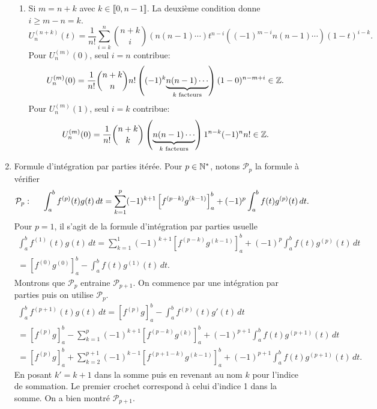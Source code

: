 \begin{enumerate}
\begin{enumerate}
    \item Si $m = n + k$ avec $k \in \llbracket 0, n-1 \rrbracket$. La deuxième condition donne $i \geq m-n = k$.
\[
 U_n^{(n+k)}(t) = \frac{1}{n!}\sum_{i=k}^{n}\binom{n+k}{i}\left( n(n-1)\cdots\right) t^{n-i}\left((-1)^{m-i}n(n-1)\cdots \right) (1-t)^{i - k}.
\]
Pour $U_n^{(m)}(0)$, seul $i=n$ contribue:
\[
 U_n^{(m)}(0) = \frac{1}{n!}\binom{n+k}{n} n! \left((-1)^{k}\underset{k \text{ facteurs}}{\underbrace{n(n-1)\cdots }}\right) (1-0)^{n-m+i}\in \mathbb{Z}.
\]
Pour $U_n^{(m)}(1)$, seul $i=k$ contribue:
\[
 U_n^{(m)}(0) = \frac{1}{n!}\binom{n+k}{k} \left(\underset{k \text{ facteurs}}{\underbrace{n(n-1)\cdots }}\right)1^{n-k} (-1)^n n! \in \mathbb{Z}.
\]
    
  \end{enumerate}

 \item Formule d'intégration par parties itérée.\newline
 Pour $p \in \mathbb{N}^*$, notons $\mathcal{P}_p$ la formule à vérifier
\[
\mathcal{P}_p : \hspace{0.5cm}
\int_a^b f^{(p)}(t) g(t)\,dt 
 = \sum_{k=1}^{p}(-1)^{k+1} \left[ f^{(p-k)} g^{(k-1)}\right]_{a}^{b}
 + (-1)^p\int_a^bf(t) g^{(p)}(t)\,dt .
\]
Pour $p=1$, il s'agit de la formule d'intégration par parties usuelle
\begin{multline*}
 \int_a^b f^{(1)}(t) g(t)\,dt 
 = \sum_{k=1}^{1}(-1)^{k+1} \left[ f^{(p-k)} g^{(k-1)}\right]_{a}^{b}
 + (-1)^p\int_a^bf(t) g^{(p)}(t)\,dt \\
 = \left[ f^{(0)} g^{(0)}\right]_{a}^{b} - \int_a^b f(t) g^{(1)}(t)\,dt .
\end{multline*}
Montrons que $\mathcal{P}_p$ entraine $\mathcal{P}_{p+1}$. On commence par une intégration par parties puis on utilise $\mathcal{P}_p$.
\begin{multline*}
 \int_a^b f^{(p+1)}(t) g(t)\,dt = \left[ f^{(p)}g\right]_a^{b} - \int_a^b f^{(p)}(t)g'(t)\, dt \\
 = \left[ f^{(p)}g\right]_a^{b} - \sum_{k=1}^{p}(-1)^{k+1} \left[ f^{(p-k)} g^{(k)}\right]_{a}^{b}
 + (-1)^{p+1}\int_a^bf(t) g^{(p+1)}(t)\,dt \\
 = \left[ f^{(p)}g\right]_a^{b} + \sum_{k=2}^{p+1}(-1)^{k-1} \left[ f^{(p+1-k)} g^{(k-1)}\right]_{a}^{b}
 + (-1)^{p+1}\int_a^bf(t) g^{(p+1)}(t)\,dt.
\end{multline*}
En posant $k' = k+1$ dans la somme puis en revenant au nom $k$ pour l'indice de sommation. Le premier crochet correspond à celui d'indice 1 dans la somme. On a bien montré $\mathcal{P}_{p+1}$.
 

\end{enumerate}
